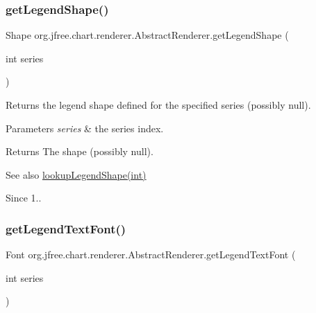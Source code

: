 \subsubsection{\texorpdfstring{get\+Legend\+Shape()}{getLegendShape()}}
{\footnotesize\ttfamily Shape org.\+jfree.\+chart.\+renderer.\+Abstract\+Renderer.\+get\+Legend\+Shape (\begin{DoxyParamCaption}\item[{int}]{series }\end{DoxyParamCaption})}

Returns the legend shape defined for the specified series (possibly {\ttfamily null}).


\begin{DoxyParams}{Parameters}
{\em series} & the series index.\\
\hline
\end{DoxyParams}
\begin{DoxyReturn}{Returns}
The shape (possibly {\ttfamily null}).
\end{DoxyReturn}
\begin{DoxySeeAlso}{See also}
\mbox{\hyperlink{classorg_1_1jfree_1_1chart_1_1renderer_1_1_abstract_renderer_a2de16cff7b8eb8ea2612037b0b7321a0}{lookup\+Legend\+Shape(int)}}
\end{DoxySeeAlso}
\begin{DoxySince}{Since}
1.. 
\end{DoxySince}
\mbox{\label{classorg_1_1jfree_1_1chart_1_1renderer_1_1_abstract_renderer_a12e9a9c5c10725536c9a620265f3fea5}} 
\subsubsection{\texorpdfstring{get\+Legend\+Text\+Font()}{getLegendTextFont()}}
{\footnotesize\ttfamily Font org.\+jfree.\+chart.\+renderer.\+Abstract\+Renderer.\+get\+Legend\+Text\+Font (\begin{DoxyParamCaption}\item[{int}]{series }\end{DoxyParamCaption})}

